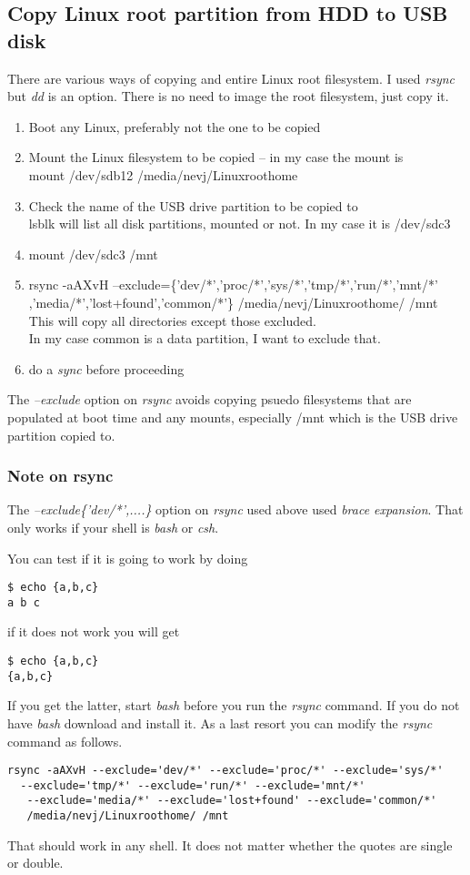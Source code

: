 \documentclass{article}  %
\begin{document}
\subsection{Copy Linux root partition from HDD to USB disk}
There are various ways of copying and entire Linux root filesystem. I used {\em rsync} but {\em dd} is an option. There is no need to image the root filesystem, just copy it.

\begin{enumerate}
\item Boot any Linux, preferably not  the one to be copied
\item Mount the Linux filesystem to be copied -- in my case the mount is \\
mount /dev/sdb12 /media/nevj/Linuxroothome
\item Check the name of the USB drive partition to be copied to  \\
 lsblk will list all disk partitions, mounted or not.  In my case it is /dev/sdc3
\item mount /dev/sdc3 /mnt
\item rsync -aAXvH --exclude=\{'dev/*','proc/*','sys/*','tmp/*','run/*','mnt/*' \\
      ,'media/*','lost+found','common/*'\} /media/nevj/Linuxroothome/ /mnt  \\
This will copy all directories except those excluded. \\
In my case common is a data partition, I want to exclude that.
\item do a {\em sync} before proceeding
\end{enumerate}
The {\em --exclude} option on {\em rsync} avoids copying psuedo filesystems that are populated at boot time and any mounts, especially /mnt which is the USB drive partition copied to.

\subsubsection{Note on rsync}
The {\em --exclude\{'dev/*',....\}} option on {\em rsync} used above used {\em brace expansion}. That only works if your shell is {\em bash} or {\em csh}. 

You can test if it is going to work by doing
\begin{verbatim}
$ echo {a,b,c}
a b c
\end{verbatim}
if it does not work you will get
\begin{verbatim}
$ echo {a,b,c}
{a,b,c}
\end{verbatim}
If you get the latter, start {\em bash} before you run the {\em rsync} command.
If you do not have {\em bash} download and install it.
As a last resort you can modify the {\em rsync} command as follows.
\begin{verbatim}
rsync -aAXvH --exclude='dev/*' --exclude='proc/*' --exclude='sys/*' 
  --exclude='tmp/*' --exclude='run/*' --exclude='mnt/*'
   --exclude='media/*' --exclude='lost+found' --exclude='common/*' 
   /media/nevj/Linuxroothome/ /mnt  
\end{verbatim}
That should work in any shell.
It does not matter whether the quotes are single or double.
\end{document}
